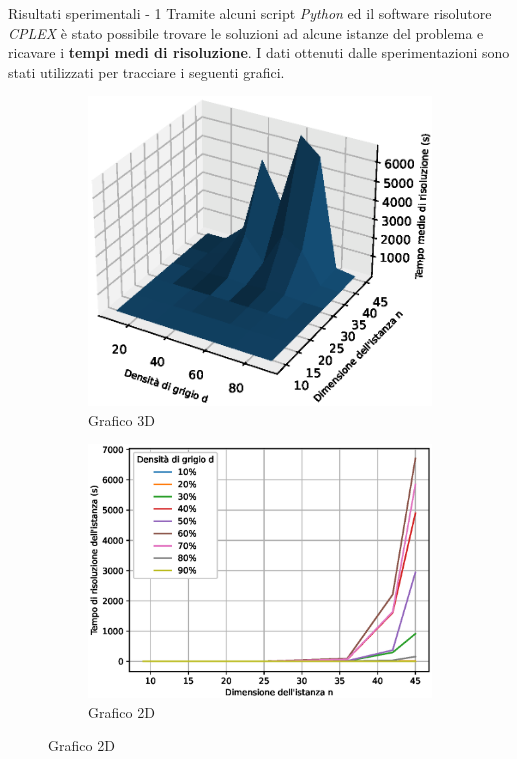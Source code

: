 \documentclass[a4paper]{beamer}
\begin{document}
\begin{frame}{Risultati sperimentali - 1}
Tramite alcuni script \textit{Python} ed il software risolutore \textit{CPLEX} è stato possibile trovare le soluzioni ad alcune istanze del problema
e ricavare i \textbf{tempi medi di risoluzione}. I dati ottenuti dalle sperimentazioni sono stati utilizzati per tracciare i seguenti grafici.
\begin{figure}[h!]
	\centering
	\begin{subfigure}[t]{4cm}
		\includegraphics[scale=0.4]{images/resolution_times.eps}
		\caption{Grafico 3D}
	\end{subfigure}
	\hspace{5em}
	\begin{subfigure}[t]{4.5cm}
		\includegraphics[scale=0.3]{images/resolution_times2.eps}
		\caption{Grafico 2D}
	\end{subfigure}
\end{figure}
\end{frame}
\end{document}
